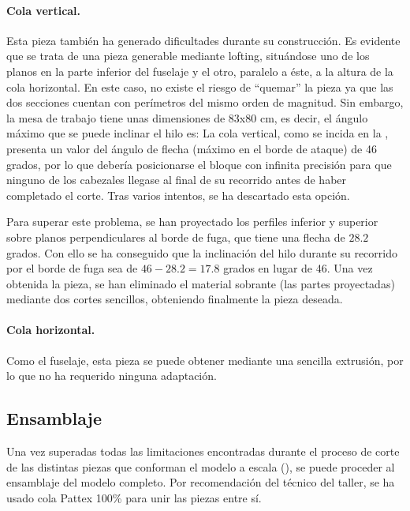 \paragraph{Cola vertical.} Esta pieza también ha generado dificultades durante su construcción. Es evidente que se trata de una pieza generable mediante lofting, situándose uno de los planos en la parte inferior del fuselaje y el otro, paralelo a éste, a la altura de la cola horizontal. En este caso, no existe el riesgo de “quemar” la pieza ya que las dos secciones cuentan con perímetros del mismo orden de magnitud. Sin embargo, la mesa de trabajo tiene unas dimensiones de 83x80 cm, es decir, el ángulo máximo que se puede inclinar el hilo es:
La cola vertical, como se incida en la , presenta un valor del ángulo de flecha (máximo en el borde de ataque) de 46 grados, por lo que debería posicionarse el bloque con infinita precisión para que ninguno de los cabezales llegase al final de su recorrido antes de haber completado el corte. Tras varios intentos, se ha descartado esta opción.

Para superar este problema, se han proyectado los perfiles inferior y superior sobre planos perpendiculares al borde de fuga, que tiene una flecha de $28.2$ grados. Con ello se ha conseguido que la inclinación del hilo durante su recorrido por el borde de fuga sea de $46 - 28.2 = 17.8$ grados en lugar de 46. Una vez obtenida la pieza, se han eliminado el material sobrante (las partes proyectadas) mediante dos cortes sencillos, obteniendo finalmente la pieza deseada.

\paragraph{Cola horizontal.} Como el fuselaje, esta pieza se puede obtener mediante una sencilla extrusión, por lo que no ha requerido ninguna adaptación.


\subsection{Ensamblaje}
\label{sec:building:assembly}

Una vez superadas todas las limitaciones encontradas durante el proceso de corte de las distintas piezas que conforman el modelo a escala (), se puede proceder al ensamblaje del modelo completo. Por recomendación del técnico del taller, se ha usado cola Pattex 100\% para unir las piezas entre sí.

